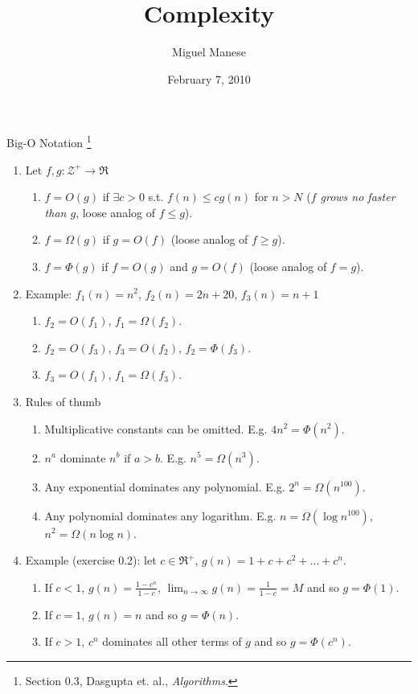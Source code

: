 \documentclass{article}
\title{Complexity}
\author{Miguel Manese}
\date{February 7, 2010}
\begin{document}
\maketitle
\begin{section}{Big-O Notation 
    \footnote{Section 0.3, Dasgupta et. al., \emph{Algorithms}.}}
\begin{enumerate}
\item Let $f, g : \mathcal{Z}^{+} \rightarrow \Re$
  \begin{enumerate}
  \item $f = O(g)$ if $\exists c > 0$ s.t. $f(n) \leq c g(n)$ for $n > N$
  (\emph{$f$ grows no faster than $g$}, loose analog of $f \leq g$).
  \item $f = \Omega(g)$ if $g = O(f)$ (loose analog of $f \geq g$).
  \item $f = \Phi(g)$ if $f = O(g)$ and $g = O(f)$ (loose analog of $f = g$).
  \end{enumerate}
\item Example: $f_{1}(n) = n^2$, $f_{2}(n) = 2n + 20$, $f_{3}(n) = n + 1$
  \begin{enumerate}
  \item $f_{2} = O(f_{1})$, $f_{1} = \Omega(f_{2})$.
  \item $f_2 = O(f_{3})$, $f_{3} = O(f_2)$, $f_2 = \Phi(f_3)$.
  \item $f_3 = O(f_1)$, $f_1 = \Omega(f_3)$.
  \end{enumerate}
\item Rules of thumb
  \begin{enumerate}
  \item Multiplicative constants can be omitted. E.g. $4n^2 = \Phi(n^2)$.
  \item $n^a$ dominate $n^b$ if $ a > b$. E.g. $n^5 = \Omega(n^3)$.
  \item Any exponential dominates any polynomial. E.g. $2^n = \Omega(n^100)$.
  \item Any polynomial dominates any logarithm. E.g. $n = \Omega(\log n^100)$,
    $n^2 = \Omega(n \log n)$.
  \end{enumerate}
\item Example (exercise 0.2): let $c \in \Re^{+}$, $g(n) = 1 + c + c^2 + 
 \ldots + c^n$.
  \begin{enumerate}
  \item If $c < 1$, $g(n) = \frac{1 - c^n}{1 - c}$, $\lim_{n \to \infty}
    g(n) = \frac{1}{1 - c} = M$ and so $g = \Phi(1)$.
  \item If $c = 1$, $g(n) = n$ and so $g = \Phi(n)$.
  \item If $c > 1$, $c^n$ dominates all other terms of $g$ and so
    $g = \Phi(c^n)$.
  \end{enumerate}
\end{enumerate}
\end{section}
\end{document}
